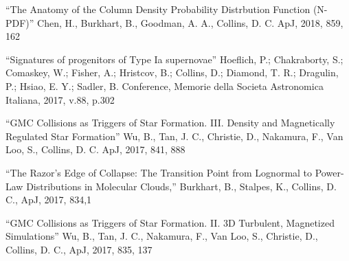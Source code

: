 \medskip
\noindent
``The Anatomy of the Column Density Probability Distrbution Function (N-PDF)''
Chen, H., Burkhart, B., Goodman, A. A., Collins, D. C. 
ApJ, 2018, 859, 162

\medskip
\noindent
``Signatures of progenitors of Type Ia supernovae''
Hoeflich, P.; Chakraborty, S.; Comaskey, W.; Fisher, A.; Hristcov, B.; Collins, D.; Diamond, T. R.; Dragulin, P.; Hsiao, E. Y.; Sadler, B.
Conference, Memorie della Societa Astronomica Italiana, 2017, v.88, p.302

\medskip
\noindent
``GMC Collisions as Triggers of Star Formation. III. Density and Magnetically Regulated Star Formation''
Wu, B., Tan, J. C., Christie, D., Nakamura, F., Van Loo, S., Collins, D. C. 
ApJ, 2017, 841, 888

\medskip
\noindent
``The Razor’s Edge of Collapse: The Transition Point from Lognormal to Power-Law Distributions in Molecular Clouds,'' 
Burkhart, B., Stalpes, K., Collins, D. C.,
ApJ, 2017, 834,1

\medskip
\noindent
``GMC Collisions as Triggers of Star Formation. II. 3D Turbulent, Magnetized Simulations'' 
Wu, B., Tan, J. C., Nakamura, F., Van Loo, S., Christie, D., Collins, D. C., 
ApJ, 2017, 835, 137

